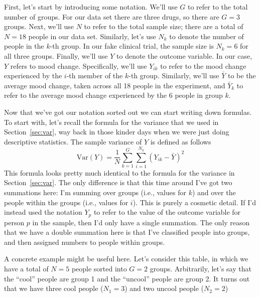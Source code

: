 
First, let's start by introducing some notation. We'll use $G$ to refer to the total number of groups. For our data set there are three drugs, so there are $G=3$ groups. Next, we'll use $N$ to refer to the total sample size; there are a total of $N=18$ people in our data set. Similarly, let's use $N_k$ to denote the number of people in the $k$-th group. In our fake clinical trial, the sample size is $N_k = 6$ for all three groups. Finally, we'll use $Y$ to denote the outcome variable. In our case, $Y$ refers to mood change. Specifically, we'll use $Y_{ik}$ to refer to the mood change experienced by the $i$-th member of the $k$-th group. Similarly, we'll use $\bar{Y}$ to be the average mood change, taken across all 18 people in the experiment, and $\bar{Y}_k$ to refer to the average mood change experienced by the 6 people in group $k$.  

\vspace{0.5cm}
\begin{mdframed}[style=MyFrame,nobreak=true]
Now that we've got our notation sorted out we can start writing down formulas. To start with, let's recall the formula for the variance that we used in Section~\ref{sec:var}, way back in those kinder days when we were just doing descriptive statistics. The sample variance of $Y$ is defined as follows
$$
\mbox{Var}(Y) = \frac{1}{N} \sum_{k=1}^G \sum_{i=1}^{N_k} \left(Y_{ik} - \bar{Y} \right)^2
$$
This formula looks pretty much identical to the formula for the variance in Section~\ref{sec:var}. The only difference is that this time around I've got two summations here: I'm summing over groups (i.e., values for $k$) and over the people within the groups (i.e., values for $i$). This is purely a cosmetic detail. If I'd instead used the notation $Y_p$ to refer to the value of the outcome variable for person $p$ in the sample, then I'd only have a single summation. The only reason that we have a double summation here is that I've classified people into groups, and then assigned numbers to people within groups. 
\end{mdframed}

A concrete example might be useful here. Let's consider this table, in which we have a total of $N=5$ people sorted into $G=2$ groups. Arbitrarily, let's say that the ``cool'' people are group 1 and the ``uncool'' people are group 2. It turns out that we have three cool people ($N_1 = 3$) and two uncool people ($N_2 = 2$)

